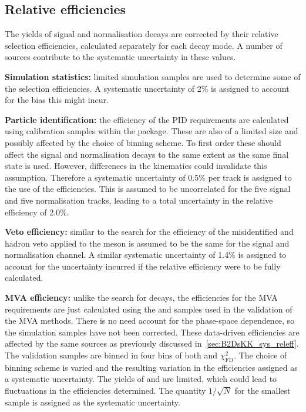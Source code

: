 \subsection{Relative efficiencies}
The yields of signal and normalisation decays are corrected by their relative selection efficiencies, calculated separately for each \Dsp decay mode. A number of sources contribute to the systematic uncertainty in these values.

\begin{description}
\item \textbf{Simulation statistics:} limited simulation samples are used to determine some of the selection efficiencies. A systematic uncertainty of 2\% is assigned to account for the bias this might incur. 

\item \textbf{Particle identification:} the efficiency of the PID requirements are calculated using calibration samples within the \pidcalib package. These are also of a limited size and possibly affected by the choice of binning scheme. To first order these should affect the signal and normalisation decays to the same extent as the same final state is used. However, differences in the kinematics could invalidate this assumption. Therefore a systematic uncertainty of 0.5\% per track is assigned to the use of the \pidcalib efficiencies. This is assumed to be uncorrelated for the five signal and five normalisation tracks, leading to a total uncertainty in the relative efficiency of 2.0\%. 

\item \textbf{Veto efficiency:} similar to the search for \decay{\Bp}{\Dsp\Kp\Km} the efficiency of the misidentified \D and \Lc hadron veto applied to the \Dsp meson is assumed to be the same for the signal and normalisation channel. A similar systematic uncertainty of 1.4\% is assigned to account for the uncertainty incurred if the relative efficiency were to be fully calculated. 

\item \textbf{MVA efficiency:} unlike the search for \decay{\Bp}{\Dsp\Kp\Km} decays, the efficiencies for the MVA requirements are just calculated using the \decay{\Bs}{\jpsi\phiz} and \decay{\Bsb}{\Dsp\pim} samples used in the validation of the MVA methods. There is no need account for the phase-space dependence, so the simulation samples have not been corrected. 
These data-driven efficiencies are affected by the same sources as previously discussed in~\ref{sec:B2DsKK_sys_releff}.
The validation samples are binned in four bins of both \pt and $\chi^{2}_{\text{FD}}$. The choice of binning scheme is varied and the resulting variation in the efficiencies assigned as a systematic uncertainty. The yields of \decay{\Bs}{\jpsi\phiz} and \decay{\Bsb}{\Dsp\pim} are limited, which could lead to fluctuations in the efficiencies determined. The quantity $1/\sqrt{N}$ for the smallest sample is assigned as the systematic uncertainty. 


\end{description}

